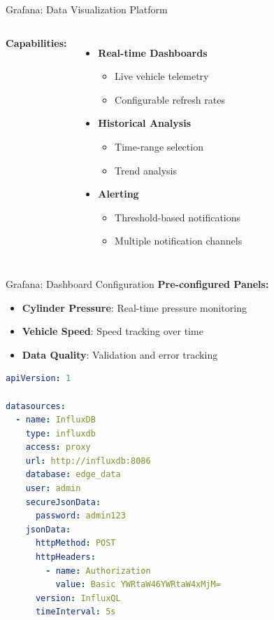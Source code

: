 \documentclass[aspectratio=169]{beamer}
\begin{document}
\begin{frame}{Grafana: Data Visualization Platform}
\begin{columns}
\textbf{Capabilities:}
\begin{itemize}
    \item \textbf{Real-time Dashboards}
    \begin{itemize}
        \item Live vehicle telemetry
        \item Configurable refresh rates
    \end{itemize}
    \item \textbf{Historical Analysis}
    \begin{itemize}
        \item Time-range selection
        \item Trend analysis
    \end{itemize}
    \item \textbf{Alerting}
    \begin{itemize}
        \item Threshold-based notifications
        \item Multiple notification channels
    \end{itemize}
\end{itemize}

\begin{center}
\end{center}
\end{columns}
\end{frame}

\begin{frame}{Grafana: Dashboard Configuration}
\textbf{Pre-configured Panels:}
\begin{itemize}
    \item \textbf{Cylinder Pressure}: Real-time pressure monitoring
    \item \textbf{Vehicle Speed}: Speed tracking over time
    \item \textbf{Data Quality}: Validation and error tracking
\end{itemize}

\vspace{0.5cm}
\begin{lstlisting}[language=yaml]
apiVersion: 1

datasources:
  - name: InfluxDB
    type: influxdb
    access: proxy
    url: http://influxdb:8086
    database: edge_data
    user: admin
    secureJsonData:
      password: admin123
    jsonData:
      httpMethod: POST
      httpHeaders:
        - name: Authorization
          value: Basic YWRtaW46YWRtaW4xMjM=
      version: InfluxQL
      timeInterval: 5s
\end{lstlisting}
\end{frame}
\end{document}

